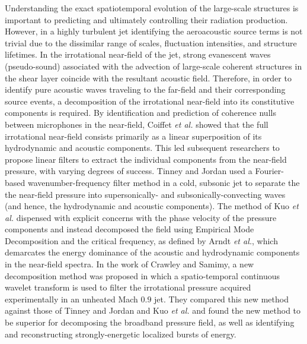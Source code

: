\documentclass[english]{aiaa-tc}
\begin{document}
Understanding the exact spatiotemporal evolution of the large-scale structures is important to predicting and ultimately controlling their radiation production. However, in a highly turbulent jet identifying the aeroacoustic source terms is not trivial due to the dissimilar range of scales, fluctuation intensities, and structure lifetimes. In the irrotational near-field of the jet, strong evanescent waves (pseudo-sound) associated with the advection of large-scale coherent structures in the shear layer coincide with the resultant acoustic field. Therefore, in order to identify pure acoustic waves traveling to the far-field and their corresponding source events, a decomposition of the irrotational near-field into its constitutive components is required. By identification and prediction of coherence nulls between microphones in the near-field, Coiffet {\em et al.}\cite{Coiffet2006} showed that the full irrotational near-field consists primarily as a linear superposition of its hydrodynamic and acoustic components. This led subsequent researchers to propose linear filters to extract the individual components from the near-field pressure, with varying degrees of success. 
 Tinney and Jordan\cite{Tinney2008} used a Fourier-based wavenumber-frequency filter method in a cold, subsonic jet to separate the the near-field pressure into supersonically- and subsonically-convecting waves (and hence, the hydrodynamic and acoustic components). The method of Kuo {\em et al.}\cite{Kuo2013} dispensed with explicit concerns with the phase velocity of the pressure components and instead decomposed the field using Empirical Mode Decomposition and the critical frequency, as defined by Arndt {\em et al.}\cite{Arndt1997}, which demarcates the energy dominance of the acoustic and hydrodynamic components in the near-field spectra. In the work of Crawley and Samimy\cite{crawley2014b}, a new decomposition method was proposed in which a spatio-temporal continuous wavelet transform is used to filter the irrotational pressure acquired experimentally in an unheated Mach $0.9$ jet. They compared this new method against those of Tinney and Jordan\cite{Tinney2008} and Kuo {\em et al.}\cite{Kuo2013} and found the new method to be superior for decomposing the broadband pressure field, as well as identifying and reconstructing strongly-energetic localized bursts of energy.  
\end{document}
